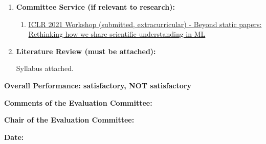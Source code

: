 \documentclass[11pt]{article}
\begin{document}
\begin{enumerate}
        \item \textbf{Committee Service (if relevant to research):}

        \begin{enumerate}
            \item \href{https://newpapers.github.io/}{ICLR 2021 Workshop (submitted, extracurricular) - Beyond static papers: Rethinking how we share scientific understanding in ML}
        \end{enumerate}

        \item \textbf{Literature Review  (must be attached):}

        Syllabus attached.

    \end{enumerate}

    \bigskip

    \newpage
    \textbf{Overall Performance: \qquad satisfactory\underline{\hspace{20mm}},
    \qquad NOT satisfactory\underline{\hspace{20mm}}}

    \bigskip
    \textbf{Comments of the Evaluation Committee:}

    \bigskip

    \vspace{100mm}


    \textbf{Chair of the  Evaluation Committee:}
    \bigskip

    \textbf{Date:} %
\end{document}

